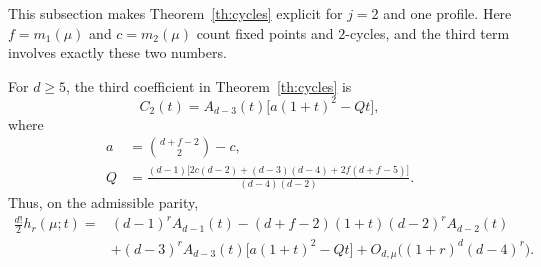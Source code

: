 \label{sec:third}
This subsection makes Theorem~\ref{th:cycles} explicit for $j=2$ and one profile. Here $f=m_1(\mu)$ and $c=m_2(\mu)$ count fixed points and $2$-cycles, and the third term involves exactly these two numbers.
\begin{theorem}\label{th:third}
For $d\ge5$, the third coefficient in Theorem~\ref{th:cycles} is
\begin{equation}\label{eq:third}
 C_2(t)=A_{d-3}(t)\bigl[a(1+t)^2-Qt\bigr],
\end{equation}
where
\begin{align}
 a&=\binom{d+f-2}{2}-c,\label{eq:third-a}\\
 Q&=\frac{(d-1)\bigl[2c(d-2)+(d-3)(d-4)+2f(d+f-5)\bigr]}
 {(d-4)(d-2)}.\label{eq:third-Q}
\end{align}
Thus, on the admissible parity,
\begin{align*}
 \frac{d!}{2}h_r(\mu;t)
 ={}&(d-1)^rA_{d-1}(t)
 -(d+f-2)(1+t)(d-2)^rA_{d-2}(t)\\
 &+(d-3)^rA_{d-3}(t)\bigl[a(1+t)^2-Qt\bigr]
 +O_{d,\mu}\bigl((1+r)^d(d-4)^r\bigr).
\end{align*}
\end{theorem}
